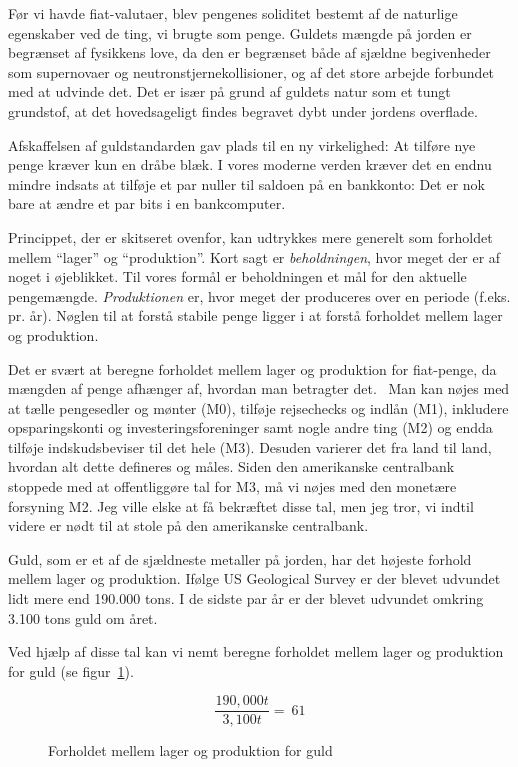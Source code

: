 \documentclass[paper=6in:9in,pagesize=pdftex,headinclude=on,footinclude=on,12pt]{scrbook}
\begin{document}
Før vi havde fiat-valutaer, blev pengenes soliditet bestemt af de naturlige egenskaber ved de ting, vi brugte som penge. Guldets mængde på jorden er begrænset af fysikkens love, da den er begrænset både af sjældne begivenheder som supernovaer og neutronstjernekollisioner, og af det store arbejde forbundet med at udvinde det. Det er især på grund af guldets natur som et tungt grundstof, at det hovedsageligt findes begravet dybt under jordens overflade.

Afskaffelsen af guldstandarden gav plads til en ny virkelighed: At tilføre nye penge kræver kun en dråbe blæk. I vores moderne verden kræver det en endnu mindre indsats at tilføje et par nuller til saldoen på en bankkonto: Det er nok bare at ændre et par bits i en bankcomputer.

Princippet, der er skitseret ovenfor, kan udtrykkes mere generelt som forholdet mellem \enquote{lager} og \enquote{produktion}. Kort sagt er \textit{beholdningen}, hvor meget der er af noget i øjeblikket. Til vores formål er beholdningen et mål for den aktuelle pengemængde. \textit{Produktionen} er, hvor meget der produceres over en periode (f.eks. pr. år). Nøglen til at forstå stabile penge ligger i at forstå forholdet mellem lager og produktion.

Det er svært at beregne forholdet mellem lager og produktion for fiat-penge, da mængden af penge afhænger af, hvordan man betragter det.~\cite{wiki:money-supply} Man kan nøjes med at tælle pengesedler og mønter (M0), tilføje rejsechecks og indlån (M1), inkludere opsparingskonti og investeringsforeninger samt nogle andre ting (M2) og endda tilføje indskudsbeviser til det hele (M3). Desuden varierer det fra land til land, hvordan alt dette defineres og måles. Siden den amerikanske centralbank stoppede med at offentliggøre \cite{web:fed-m3} tal for M3, må vi nøjes med den monetære forsyning M2. Jeg ville elske at få bekræftet disse tal, men jeg tror, vi indtil videre er nødt til at stole på den amerikanske centralbank.

Guld, som er et af de sjældneste metaller på jorden, har det højeste forhold mellem lager og produktion. Ifølge US Geological Survey er der blevet udvundet lidt mere end 190.000 tons. I de sidste par år er der blevet udvundet omkring 3.100 tons guld om året.~\cite{mineral-commodity-summaries}

Ved hjælp af disse tal kan vi nemt beregne forholdet mellem lager og produktion for guld (se figur~\ref{fig:stock-to-flow-gold}).

\begin{figure}
  \centering
  \begin{equation}
  \frac{190,000 t}{3,100 t} = ~ 61
  \end{equation}
  \caption{Forholdet mellem lager og produktion for guld}
  \label{fig:stock-to-flow-gold}
\end{figure}
\end{document}
